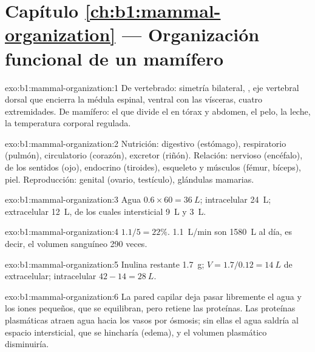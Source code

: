 \section*{Capítulo \ref{ch:b1:mammal-organization} --- Organización funcional de un mamífero}

\begin{solution}{exo:b1:mammal-organization:1}
De vertebrado: simetría bilateral, , eje vertebral dorsal que
encierra la médula espinal,  ventral con las vísceras, cuatro
extremidades. De mamífero: el  que divide el  en tórax y
abdomen, el pelo, la leche, la temperatura corporal regulada.
\end{solution}

\begin{solution}{exo:b1:mammal-organization:2}
Nutrición: digestivo (estómago), respiratorio (pulmón), circulatorio
(corazón), excretor (riñón). Relación: nervioso (encéfalo),  de los
sentidos (ojo), endocrino (tiroides), esqueleto y músculos (fémur, bíceps),
piel. Reproducción: genital (ovario, testículo), glándulas mamarias.
\end{solution}

\begin{solution}{exo:b1:mammal-organization:3}
Agua $0.6\times 60 = \qty{36}{L}$; intracelular \qty{24}{L};
extracelular \qty{12}{L}, de los cuales intersticial \qty{9}{L} y 
\qty{3}{L}.
\end{solution}

\begin{solution}{exo:b1:mammal-organization:4}
$1.1/5 = 22\%$. \qty{1.1}{L/min} son \qty{1580}{L} al día, es decir, el
volumen sanguíneo 290 veces.
\end{solution}

\begin{solution}{exo:b1:mammal-organization:5}
Inulina restante \qty{1.7}{g}; $V = 1.7/0.12 = \qty{14}{L}$ de
extracelular; intracelular $42 - 14 = \qty{28}{L}$.
\end{solution}

\begin{solution}{exo:b1:mammal-organization:6}
La pared capilar deja pasar libremente el agua y los iones pequeños, que se
equilibran, pero retiene las proteínas. Las proteínas plasmáticas atraen
agua hacia los vasos por ósmosis; sin ellas el agua saldría al espacio
intersticial, que se hincharía (edema), y el volumen plasmático
disminuiría.
\end{solution}

